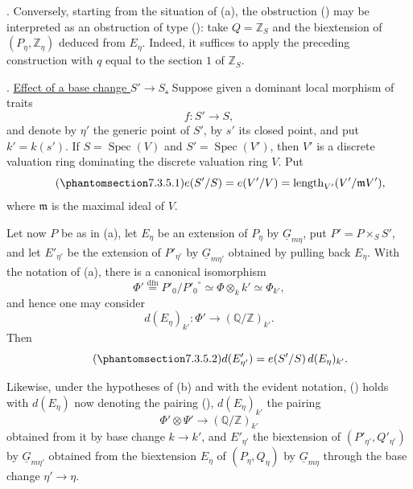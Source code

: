 \smallskip
\noindent {}.  Conversely, starting from the situation of (a), the
obstruction () may be interpreted as an obstruction of type ():
take $Q=\mathbb Z_S$ and the biextension of $(P_\eta,\mathbb Z_\eta)$
deduced from $E_\eta$.  Indeed, it suffices to apply the preceding
construction with $q$ equal to the section $1$ of $\mathbb Z_S$.

\medskip
\noindent {}.  \underline{Effect of a base change $S'\to S$.}  Suppose
given a dominant local morphism of traits
\[
 f:S'\longrightarrow S,
\]
and denote by $\eta'$ the generic point of $S'$, by $s'$ its closed point,
and put $k'=k(s')$.  If $S=\operatorname{Spec}(V)$ and
$S'=\operatorname{Spec}(V')$, then $V'$ is a discrete valuation ring
dominating the discrete valuation ring $V$.  Put
\begin{equation}\tag{\SGARefTarget{sga7.sga7i.eviii.n7-3-5-1}{7.3.5.1}}
 e(S'/S)=e(V'/V)=\operatorname{length}_{V'}(V'/\mathfrak m V'),
\end{equation}
where $\mathfrak m$ is the maximal ideal of $V$.

Let now $P$ be as in (a), let $E_\eta$ be an extension of $P_\eta$ by
$\underline G_{m\eta}$, put $P'=P\times_S S'$, and let $E'_{\eta'}$ be
the extension of $P'_{\eta'}$ by $\underline G_{m\eta'}$ obtained by
pulling back $E_\eta$.  With the notation of (a), there is a canonical
isomorphism
\[
 \Phi'\overset{\mathrm{dfn}}{=}P'_0/{P'_0}^{\circ}
 \simeq\Phi\otimes_k k'\simeq\Phi_{k'},
\]
and hence one may consider
\[
 d(E_\eta)_{k'}:\Phi'\longrightarrow(\mathbb Q/\mathbb Z)_{k'}.
\]
Then
\begin{equation}\tag{\SGARefTarget{sga7.sga7i.eviii.n7-3-5-2}{7.3.5.2}}
 d(E'_{\eta'})=e(S'/S)\,d(E_\eta)_{k'}.
\end{equation}

Likewise, under the hypotheses of (b) and with the evident notation,
() holds with $d(E_\eta)$ now denoting the pairing (),
$d(E_\eta)_{k'}$ the pairing
\[
 \Phi'\otimes\Psi'\longrightarrow(\mathbb Q/\mathbb Z)_{k'}
\]
obtained from it by base change $k\to k'$, and $E'_{\eta'}$ the
biextension of $(P'_{\eta'},Q'_{\eta'})$ by
$\underline G_{m\eta'}$ obtained from the biextension $E_\eta$ of
$(P_\eta,Q_\eta)$ by $\underline G_{m\eta}$ through the base change
$\eta'\to\eta$.

